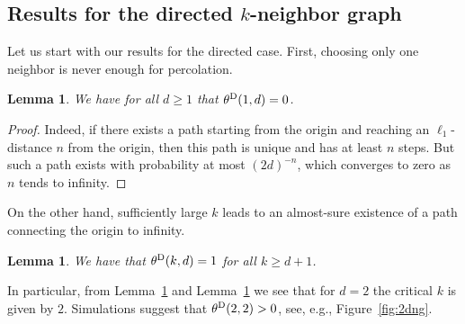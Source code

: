 \documentclass[oneside]{amsart}
\newtheorem{lemma}[theorem]{Lemma}
\theoremstyle{definition}
\newcommand{\1}{\mathbbm{1}}
\newcommand{\0}{\mathbf{o}}
\numberwithin{equation}{section}
\begin{document}
\subsection{Results for the directed $k$-neighbor graph}\label{sec:D}
Let us start with our results for the directed case. First, choosing only one neighbor is never enough for percolation. 
\begin{lemma}\label{lem:surenoperc}
We have for all $d\ge 1$ that $\theta^{\rm D}(1,d)=0$.
\end{lemma}
\begin{proof}
Indeed, if there exists a path starting from the origin and reaching an $\ell_1$-distance $n$ from the origin, then this path is unique and has at least $n$ steps. But such a path exists with probability at most $(2d)^{-n}$, which converges to zero as $n$ tends to infinity.
\end{proof}
On the other hand, sufficiently large $k$ leads to an almost-sure existence of a path connecting the origin to infinity. 
\begin{lemma}\label{lem:sureperc}
    We have that $\theta^{\rm D}(k,d)=1$ for all $k\ge d+1$.
\end{lemma}
In particular, from Lemma~\ref{lem:surenoperc} and Lemma~\ref{lem:sureperc} we see that for $d=2$ the critical $k$ is given by $2$. Simulations suggest that $\theta^{\rm D}(2,2)>0$, see, e.g., Figure~\ref{fig:2dng}.
\end{document}
